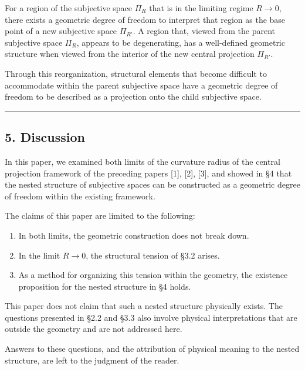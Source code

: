 \documentclass[a4paper,11pt]{article}
\theoremstyle{definition}
\providecommand{\tightlist}{\setlength{\itemsep}{0pt}\setlength{\parskip}{0pt}}
\begin{document}
For a region of the subjective space \(\Pi_R\) that is in the limiting regime \(R \to 0\), there exists a geometric degree of freedom to interpret that region as the base point of a new subjective space \(\Pi_{R'}\). A region that, viewed from the parent subjective space \(\Pi_R\), appears to be degenerating, has a well-defined geometric structure when viewed from the interior of the new central projection \(\Pi_{R'}\).

Through this reorganization, structural elements that become difficult to accommodate within the parent subjective space have a geometric degree of freedom to be described as a projection onto the child subjective space.

\begin{center}\rule{0.5\linewidth}{0.5pt}\end{center}

\subsection{5. Discussion}\label{discussion}

In this paper, we examined both limits of the curvature radius of the central projection framework of the preceding papers {[}1{]}, {[}2{]}, {[}3{]}, and showed in §4 that the nested structure of subjective spaces can be constructed as a geometric degree of freedom within the existing framework.

The claims of this paper are limited to the following:

\begin{enumerate}
\def\labelenumi{\arabic{enumi}.}
\tightlist
\item
  In both limits, the geometric construction does not break down.
\item
  In the limit \(R \to 0\), the structural tension of §3.2 arises.
\item
  As a method for organizing this tension within the geometry, the existence proposition for the nested structure in §4 holds.
\end{enumerate}

This paper does not claim that such a nested structure physically exists. The questions presented in §2.2 and §3.3 also involve physical interpretations that are outside the geometry and are not addressed here.

Answers to these questions, and the attribution of physical meaning to the nested structure, are left to the judgment of the reader.
\end{document}
